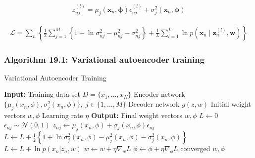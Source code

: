 \documentclass{article}
\begin{document}
\begin{align*}
z_{n j}^{(l)}=\mu_{j}\left(\mathbf{x}_{n}, \boldsymbol{\phi}\right) \epsilon_{n j}^{(l)}+\sigma_{j}^{2}\left(\mathbf{x}_{n}, \boldsymbol{\phi}\right) 
\tag{19.18}
\end{align*}

\begin{align*}
\mathcal{L}=\sum_{n}\left\{\frac{1}{2} \sum_{j=1}^{M}\left\{1+\ln \sigma_{n j}^{2}-\mu_{n j}^{2}-\sigma_{n j}^{2}\right\}+\frac{1}{L} \sum_{l=1}^{L} \ln p\left(\mathbf{x}_{n} \mid \mathbf{z}_{n}^{(l)}, \mathbf{w}\right)\right\} 
\tag{19.19}
\end{align*}

\subsubsection{Algorithm 19.1: Variational autoencoder training}

\begin{algorithm}[H]
\caption{Variational Autoencoder Training}
\begin{algorithmic}[1]
\STATE \textbf{Input:} Training data set $D = \{x_1, \ldots, x_N\}$
\STATE \quad Encoder network $\{\mu_j(x_n, \phi), \sigma_j^2(x_n, \phi)\}, \; j \in \{1, \ldots, M\}$
\STATE \quad Decoder network $g(z, w)$
\STATE \quad Initial weight vectors $w, \phi$
\STATE \quad Learning rate $\eta$
\STATE \textbf{Output:} Final weight vectors $w, \phi$
\REPEAT
    \STATE $L \gets 0$
        \STATE $\epsilon_{nj} \sim \mathcal{N}(0, 1)$
        \STATE $z_{nj} \gets \mu_j(x_n, \phi) + \sigma_j(x_n, \phi) \epsilon_{nj}$
        \STATE $L \gets L + \frac{1}{2} \left\{ 1 + \ln \sigma_j^2(x_n, \phi) - \mu_j^2(x_n, \phi) - \sigma_j^2(x_n, \phi) \right\}$
    \ENDFOR
    \STATE $L \gets L + \ln p(x_n | z_n, w)$
    \STATE $w \gets w + \eta \nabla_w L$ 
    \STATE $\phi \gets \phi + \eta \nabla_\phi L$ 
\UNTIL converged
\RETURN $w, \phi$
\end{algorithmic}
\end{algorithm}
\end{document}
